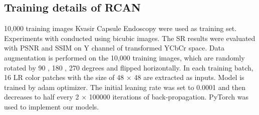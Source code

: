 \subsection{Training details of RCAN}
10,000 training images Kvasir Capsule Endoscopy were used as training set. Experiments with conducted using bicubic images. The SR results were evaluated with PSNR and SSIM on Y channel of transformed YCbCr space. Data augmentation is performed on the 10,000 training images, which are randomly rotated by 90 , 180 , 270 degrees and flipped horizontally. In each training batch, 16 LR color patches with the size of 48 × 48 are extracted as inputs. Model is trained by adam optimizer. The initial leaning rate was set to 0.0001 and then decreases to half every 2 × 100000 iterations of back-propagation. PyTorch was used to implement our models.  

